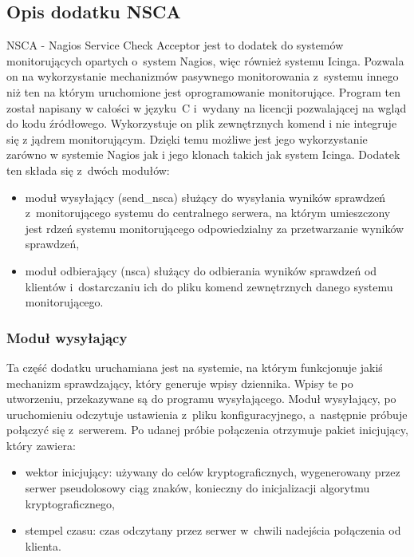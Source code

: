 \subsection[Opis dodatku NSCA][Opis dodatku NSCA]{Opis dodatku NSCA}

NSCA - Nagios Service Check Acceptor jest to dodatek do systemów
monitorujących opartych o~system Nagios, więc również systemu
Icinga. Pozwala on na wykorzystanie mechanizmów pasywnego
monitorowania z~systemu innego niż ten na którym uruchomione jest
oprogramowanie monitorujące. Program ten został napisany w całości w
języku~C i~wydany na licencji pozwalającej na wgląd do kodu
źródłowego. Wykorzystuje on plik zewnętrznych komend i nie integruje
się z jądrem monitorującym. Dzięki temu możliwe jest jego
wykorzystanie zarówno w systemie Nagios jak i jego klonach takich jak
system Icinga. Dodatek ten składa się z~dwóch modułów:

\begin{itemize}
\item moduł wysyłający (send\_nsca) służący do wysyłania wyników
  sprawdzeń z~monitorującego systemu do centralnego serwera, na którym
  umieszczony jest rdzeń systemu monitorującego odpowiedzialny za
  przetwarzanie wyników sprawdzeń,
\item moduł odbierający (nsca) służący do odbierania wyników sprawdzeń
  od klientów i~dostarczaniu ich do pliku komend zewnętrznych danego
  systemu monitorującego.
\end{itemize}


\subsubsection[Moduł wysyłający][Moduł wysyłający]{Moduł wysyłający}
\label{subsubsec:modulWysylajacy}

Ta część dodatku uruchamiana jest na systemie, na którym funkcjonuje
jakiś mechanizm sprawdzający, który generuje wpisy dziennika. Wpisy te
po utworzeniu, przekazywane są do programu wysyłającego. Moduł
wysyłający, po uruchomieniu odczytuje ustawienia z~pliku
konfiguracyjnego, a~następnie próbuje połączyć się z~serwerem. Po
udanej próbie połączenia otrzymuje pakiet inicjujący, który zawiera:

\begin{itemize}
\item wektor inicjujący: używany do celów kryptograficznych,
  wygenerowany przez serwer pseudolosowy ciąg znaków, konieczny do
  inicjalizacji algorytmu kryptograficznego,
\item stempel czasu: czas odczytany przez serwer w~chwili nadejścia
  połączenia od klienta.
\end{itemize} 

